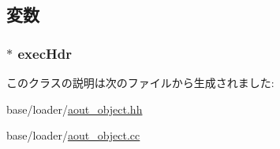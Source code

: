 \subsection{変数}
\hypertarget{classAoutObject_a786112463f52f34ed17a1cb92de0b500}{
\subsubsection[{execHdr}]{$\ast$ {\bf execHdr}}}
\label{classAoutObject_a786112463f52f34ed17a1cb92de0b500}


このクラスの説明は次のファイルから生成されました:\begin{DoxyCompactItemize}
\item 
base/loader/\hyperlink{aout__object_8hh}{aout\_\-object.hh}\item 
base/loader/\hyperlink{aout__object_8cc}{aout\_\-object.cc}\end{DoxyCompactItemize}
